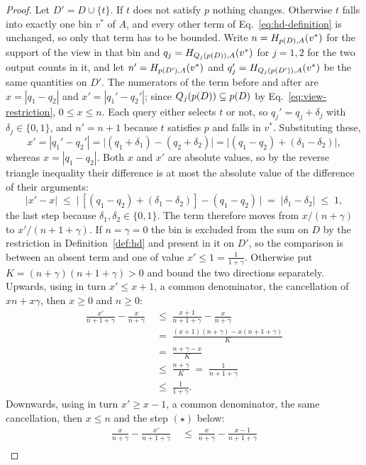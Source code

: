 \begin{proof}
Let $D'=D\cup\{t\}$.
If $t$ does not satisfy $p$ nothing changes.
Otherwise $t$ falls into exactly one bin $v^*$ of $A$, and every other term of Eq.~\eqref{eq:hd-definition} is unchanged, so only that term has to be bounded.
Write $n=H_{p(D),A}(v^*)$ for the support of the view in that bin and $q_j=H_{Q_j(p(D)),A}(v^*)$ for $j=1,2$ for the two output counts in it, and let $n'=H_{p(D'),A}(v^*)$ and $q_j'=H_{Q_j(p(D')),A}(v^*)$ be the same quantities on $D'$.
The numerators of the term before and after are $x=|q_1-q_2|$ and $x'=|q_1'-q_2'|$; since $Q_j(p(D))\subseteq p(D)$ by Eq.~\eqref{eq:view-restriction}, $0\le x\le n$.
Each query either selects $t$ or not, so $q_j'=q_j+\delta_j$ with $\delta_j\in\{0,1\}$, and $n'=n+1$ because $t$ satisfies $p$ and falls in $v^*$.
Substituting these,
\[
x'=|q_1'-q_2'|=\big|(q_1+\delta_1)-(q_2+\delta_2)\big|=\big|(q_1-q_2)+(\delta_1-\delta_2)\big| ,
\]
whereas $x=|q_1-q_2|$.
Both $x$ and $x'$ are absolute values, so by the reverse triangle inequality their difference is at most the absolute value of the difference of their arguments:
\[
|x'-x|\;\le\;\big|\,[(q_1-q_2)+(\delta_1-\delta_2)]-(q_1-q_2)\,\big|\;=\;|\delta_1-\delta_2|\;\le\;1 ,
\]
the last step because $\delta_1,\delta_2\in\{0,1\}$.
The term therefore moves from $x/(n+\gamma)$ to $x'/(n+1+\gamma)$.
If $n=\gamma=0$ the bin is excluded from the sum on $D$ by the restriction in Definition~\ref{def:hd} and present in it on $D'$, so the comparison is between an absent term and one of value $x'\le1=\frac{1}{1+\gamma}$.
Otherwise put $K=(n+\gamma)(n+1+\gamma)>0$ and bound the two directions separately.
Upwards, using in turn $x'\le x+1$, a common denominator, the cancellation of $xn+x\gamma$, then $x\ge0$ and $n\ge0$:
\begin{align*}
\frac{x'}{n+1+\gamma}-\frac{x}{n+\gamma}
&\;\le\;\frac{x+1}{n+1+\gamma}-\frac{x}{n+\gamma}\\[2pt]
&\;=\;\frac{(x+1)(n+\gamma)-x(n+1+\gamma)}{K}\\[2pt]
&\;=\;\frac{n+\gamma-x}{K}\\[2pt]
&\;\le\;\frac{n+\gamma}{K}\;=\;\frac{1}{n+1+\gamma}\\[2pt]
&\;\le\;\frac{1}{1+\gamma}.
\end{align*}
Downwards, using in turn $x'\ge x-1$, a common denominator, the same cancellation, then $x\le n$ and the step $(\star)$ below:
\begin{align*}
\frac{x}{n+\gamma}-\frac{x'}{n+1+\gamma}
&\;\le\;\frac{x}{n+\gamma}-\frac{x-1}{n+1+\gamma}\\[2pt]

\end{align*}
\end{proof}
